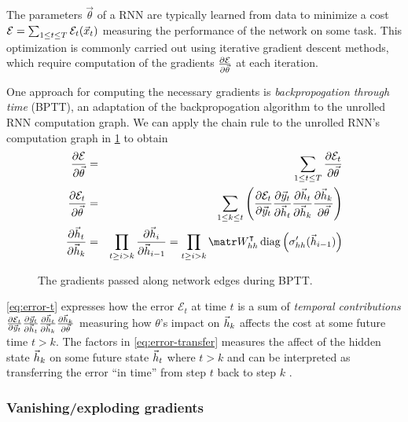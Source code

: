 The parameters $\vec{\theta}$ of a RNN are typically learned from data to
minimize a cost $\mathcal{E} = \sum_{1 \leq t \leq T} \mathcal{E}_t(\vec{x}_t)$
measuring the performance of the network on some task. This optimization is
commonly carried out using iterative gradient descent methods, which require
computation of the gradients $\frac{\partial \mathcal{E}}{\partial \vec{\theta}}$ at each
iteration.

One approach for computing the necessary gradients is \emph{backpropogation
through time} (BPTT)\citep{goller1996learning}, an adaptation of the backpropogation
algorithm\citep{linnainmaa1970representation,rumelhart1988learning} to the unrolled RNN computation
graph. We can apply the chain rule to the unrolled RNN's computation graph in
\cref{fig:rnn-bptt} to obtain
\begin{align}
    \frac{\pd \mathcal{E}}{\pd \vec{\theta}} &=& \sum_{1 \leq t \leq T} \frac{\pd \mathcal{E}_t}{\pd \vec{\theta}} \\
    \frac{\pd \mathcal{E}_t}{\pd \vec{\theta}} &=& \sum_{1 \leq k \leq t} \left(
        \frac{\pd \mathcal{E}_t}{\pd \y_t}
        \frac{\pd \y_t}{\pd \h_t}
        \frac{\pd \h_t}{\pd \h_k}
        \frac{\pd \h_k}{\pd \vec{\theta}}
    \right) \label{eq:error-t}\\
    \frac{\pd \h_t}{\pd \h_k} &=&
    \prod_{t \geq i > k} \frac{\pd \h_i}{\pd \h_{i-1}}
    = \prod_{t \geq i > k} \W_{hh}^\tp \diag \left( \sigma_{hh}'( \h_{i-1} ) \right)
    \label{eq:error-transfer}
\end{align}

\begin{figure}[htpb]
    \centering
    
    \caption{The gradients passed along network edges during BPTT.}
    \label{fig:rnn-bptt}
\end{figure}

\cref{eq:error-t} expresses how the error $\mathcal{E}_t$ at time $t$ is a sum
of \emph{temporal contributions} $
\frac{\partial \mathcal{E}_t}{\partial \vec{y}_t}
\frac{\partial \vec{y}_t}{\partial \vec{h}_t}
\frac{\partial \vec{h}_t}{\partial \vec{h}_k}
\frac{\partial \vec{h}_k}{\partial \vec{\theta}}$
measuring how $\theta$'s impact on $\vec{h}_k$ affects the cost at some future
time $t > k$. The factors in \cref{eq:error-transfer} measures the affect
of the hidden state $\vec{h}_k$ on some future state $\vec{h}_t$ where $t > k$
and can be interpreted as transferring the error ``in time'' from step $t$ back
to step $k$ \citep{Pascanu2012}.

\subsubsection{Vanishing/exploding gradients}

